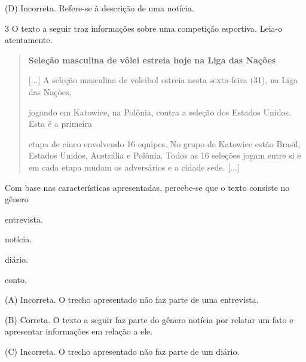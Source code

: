 \begin{escolha}
\begin{escolha}
{\begin{escolha}
(D) Incorreta. Refere-se à descrição de uma notícia.

\num{3} O texto a seguir traz informações sobre uma competição esportiva. Leia-o atentamente.

\begin{quote}
\textbf{Seleção masculina de vôlei estreia hoje na Liga das Nações}

{[}...{]} A seleção masculina de voleibol estreia nesta sexta-feira
(31), na Liga das Nações,

jogando em Katowice, na Polônia, contra a seleção dos Estados Unidos.
Esta é a primeira

etapa de cinco envolvendo 16 equipes. No grupo de Katowice estão Brasil,
Estados Unidos, Austrália e Polônia. Todos as 16 seleções jogam entre si
e em cada etapa mudam os adversários e a cidade sede. {[}...{]}
\end{quote}


Com base nas características apresentadas, percebe-se que o texto consiste no gênero

\begin{escolha}
\item entrevista.

\item notícia.

\item diário.

\item conto.
\end{escolha}


(A) Incorreta. O trecho apresentado não faz parte de uma entrevista.

(B) Correta. O texto a seguir faz parte do gênero notícia por relatar um
fato e apresentar informações em relação a ele.

(C) Incorreta. O trecho apresentado não faz parte de um diário.


\end{escolha}}
\end{escolha}
\end{escolha}
